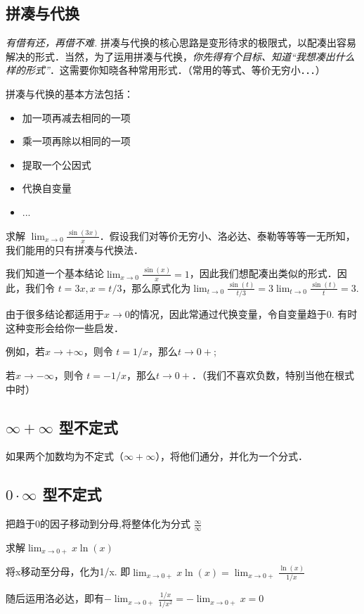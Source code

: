 \subsection{拼凑与代换}
\textsl{有借有还，再借不难.} 拼凑与代换的核心思路是变形待求的极限式，以配凑出容易解决的形式．当然，为了运用拼凑与代换，\textsl{你先得有个目标、知道“我想凑出什么样的形式”}．这需要你知晓各种常用形式．（常用的等式、等价无穷小．．．）

拼凑与代换的基本方法包括：
\begin{itemize}
\item 加一项再减去相同的一项
\item 乘一项再除以相同的一项
\item 提取一个公因式
\item 代换自变量
\item ...
\end{itemize}

\begin{example}{}
求解 $\lim_{x \to 0} \frac{\sin(3x)}{x}$．假设我们对等价无穷小、洛必达、泰勒等等等一无所知，我们能用的只有拼凑与代换法．

我们知道一个基本结论$\lim_{x \to 0} \frac{\sin(x)}{x}=1$，因此我们想配凑出类似的形式．因此，我们令 $t=3x, x=t/3$，那么原式化为$\lim_{t \to 0} \frac{\sin(t)}{t/3}=3\lim_{t \to 0} \frac{\sin(t)}{t}=3$.
\end{example}

\begin{example}{}
由于很多结论都适用于$x\to0$的情况，因此常通过代换变量，令自变量趋于0. 有时这种变形会给你一些启发．

例如，若$x\to+\infty$，则令 $t=1/x$，那么$t\to0+$; 

若$x\to-\infty$，则令 $t=-1/x$，那么$t\to0+$．（我们不喜欢负数，特别当他在根式中时）
\end{example}

\subsection{$\infty+\infty$ 型不定式}
如果两个加数均为不定式（$\infty+\infty$），将他们通分，并化为一个分式．

\subsection{$0\cdot\infty$ 型不定式}
把趋于0的因子移动到分母,将整体化为分式 $\frac{\infty}{\infty}$
\begin{example}{}
求解$\lim_{x\to0+} x\ln(x)$

将x移动至分母，化为1/x. 即$\lim_{x\to0+} x\ln(x)=\lim_{x\to0+} \frac{\ln(x)}{1/x}$

随后运用洛必达，即有$-\lim_{x\to0+} \frac{1/x}{1/x^2}=-\lim_{x\to0+} x=0$
\end{example}



